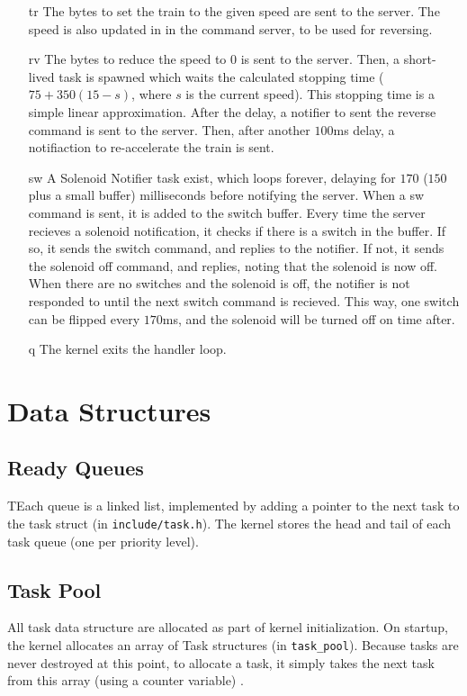 \documentclass{article}
\begin{document}
\begin{enumerate}
\item[tr] The bytes to set the train to the given speed are sent to the server. The speed is also updated in in the command server, to be used for reversing.
\item[rv] The bytes to reduce the speed to 0 is sent to the server. Then, a short-lived task is spawned which waits the calculated stopping time ($75 + 350(15 - s)$, where $s$ is the current speed).
This stopping time is a simple linear approximation.
After the delay, a notifier to sent the reverse command is sent to the server. Then, after another $100$ms delay, a notifiaction to re-accelerate the train is sent.
\item[sw] A Solenoid Notifier task exist, which loops forever, delaying for $170$ ($150$ plus a small buffer) milliseconds before notifying the server. 
When a sw command is sent, it is added to the switch buffer. 
Every time the server recieves a solenoid notification, it checks if there is a switch in the buffer. 
If so, it sends the switch command, and replies to the notifier. 
If not, it sends the solenoid off command, and replies, noting that the solenoid is now off. 
When there are no switches and the solenoid is off, the notifier is not responded to until the next switch command is recieved.
This way, one switch can be flipped every $170$ms, and the solenoid will be turned off on time after.
\item[q] The kernel exits the handler loop. 
\end{enumerate}
\section{Data Structures}
\subsection{Ready Queues}
TEach queue is a linked list, implemented by adding a pointer to the next task to the task struct (in \verb|include/task.h|). 
The kernel stores the head and tail of each task queue (one per priority level).
\subsection{Task Pool}
All task data structure are allocated as part of kernel initialization. On startup, the kernel allocates an array of Task structures (in \verb|task_pool|). Because tasks are never destroyed at this point, to allocate a task, it simply takes the next task from this array (using a counter variable) . 
\end{document}
